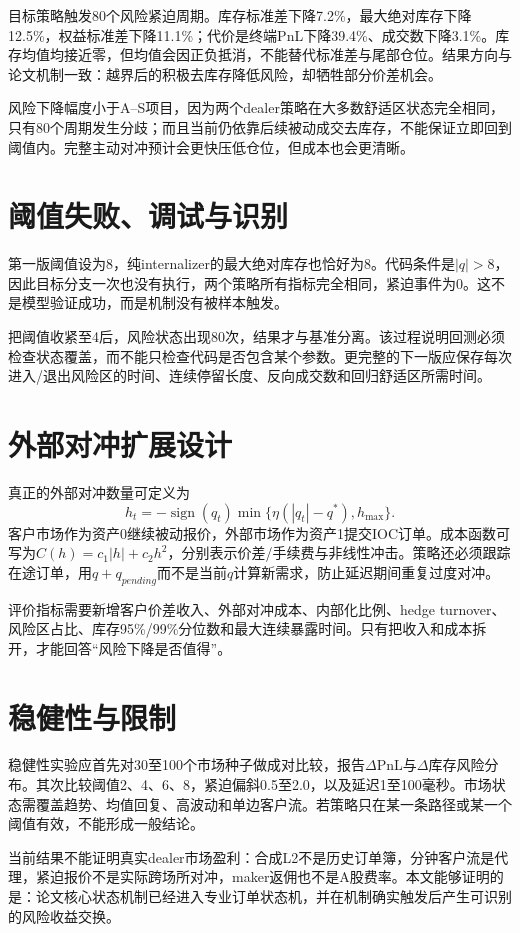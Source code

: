 \documentclass[11pt]{ctexart}
\begin{document}
目标策略触发80个风险紧迫周期。库存标准差下降7.2\%，最大绝对库存下降12.5\%，权益标准差下降11.1\%；代价是终端PnL下降39.4\%、成交数下降3.1\%。库存均值均接近零，但均值会因正负抵消，不能替代标准差与尾部仓位。结果方向与论文机制一致：越界后的积极去库存降低风险，却牺牲部分价差机会。

风险下降幅度小于A--S项目，因为两个dealer策略在大多数舒适区状态完全相同，只有80个周期发生分歧；而且当前仍依靠后续被动成交去库存，不能保证立即回到阈值内。完整主动对冲预计会更快压低仓位，但成本也会更清晰。

\section{阈值失败、调试与识别}
第一版阈值设为8，纯internalizer的最大绝对库存也恰好为8。代码条件是$|q|>8$，因此目标分支一次也没有执行，两个策略所有指标完全相同，紧迫事件为0。这不是模型验证成功，而是机制没有被样本触发。

把阈值收紧至4后，风险状态出现80次，结果才与基准分离。该过程说明回测必须检查状态覆盖，而不能只检查代码是否包含某个参数。更完整的下一版应保存每次进入/退出风险区的时间、连续停留长度、反向成交数和回归舒适区所需时间。

\section{外部对冲扩展设计}
真正的外部对冲数量可定义为
\[
h_t=-\operatorname{sign}(q_t)\min\{\eta(|q_t|-q^*),h_{\max}\}.
\]
客户市场作为资产0继续被动报价，外部市场作为资产1提交IOC订单。成本函数可写为$C(h)=c_1|h|+c_2h^2$，分别表示价差/手续费与非线性冲击。策略还必须跟踪在途订单，用$q+q_{pending}$而不是当前$q$计算新需求，防止延迟期间重复过度对冲。

评价指标需要新增客户价差收入、外部对冲成本、内部化比例、hedge turnover、风险区占比、库存95\%/99\%分位数和最大连续暴露时间。只有把收入和成本拆开，才能回答“风险下降是否值得”。

\section{稳健性与限制}
稳健性实验应首先对30至100个市场种子做成对比较，报告$\Delta$PnL与$\Delta$库存风险分布。其次比较阈值2、4、6、8，紧迫偏斜0.5至2.0，以及延迟1至100毫秒。市场状态需覆盖趋势、均值回复、高波动和单边客户流。若策略只在某一条路径或某一个阈值有效，不能形成一般结论。

当前结果不能证明真实dealer市场盈利：合成L2不是历史订单簿，分钟客户流是代理，紧迫报价不是实际跨场所对冲，maker返佣也不是A股费率。本文能够证明的是：论文核心状态机制已经进入专业订单状态机，并在机制确实触发后产生可识别的风险收益交换。
\end{document}
